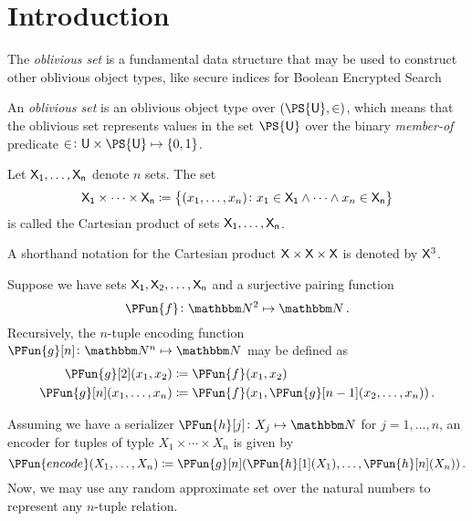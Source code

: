 \documentclass[ ../main.tex]{subfiles}
\begin{document}
\section{Introduction}
The \emph{oblivious set}\cite{oset} is a fundamental data structure that may be used to construct other oblivious object types, like secure indices for Boolean Encrypted Search\cite{sibool}

An \emph{oblivious set} is an oblivious object type over 
$(\PS{\Set{U}},\SetContains)$, which means that the oblivious set represents values in the set $\PS{\Set{U}}$ over the binary \emph{member-of} predicate $\SetContains \colon \Set{U} \times \PS{\Set{U}} \mapsto \{0,1\}$.

\begin{definition}
Let $\Set{X}[1],\ldots,\Set{X}[n]$ denote $n$ sets.
The set
\begin{equation}
\Set{X}[1] \times \cdots \times \Set{X}[n] \coloneqq \left\{(x_1,\ldots,x_n) \colon x_1 \in \Set{X}[1] \land \cdots \land x_n \in \Set{X}[n]\right\}
\end{equation}
is called the Cartesian product of sets $\Set{X}[1],\ldots,\Set{X}[n]$.
\end{definition}
A shorthand notation for the Cartesian product $\Set{X} \times \Set{X} \times \Set{X}$ is denoted by $\Set{X}^3$.

Suppose we have sets $\Set{X}[1],\Set{X}[2],\ldots,\Set{X}[n]$ and a surjective pairing function
\begin{equation}
    \PFun{f} \colon \NatSet^2 \mapsto \NatSet\,.
\end{equation}
Recursively, the $n$-tuple encoding function $\PFun{g}[n] \colon \NatSet^n \mapsto \NatSet$ may be defined as
\begin{align}
	\PFun{g}[2](x_1,x_2)		&\coloneqq \PFun{f}(x_1, x_2)\\
	\PFun{g}[n](x_1,\ldots,x_n) &\coloneqq \PFun{f}(x_1, \PFun{g}[n-1](x_2,\ldots,x_n))\,.
\end{align}

Assuming we have a serializer $\PFun{h}[j] \colon X_j \mapsto \NatSet$ for $j=1,\ldots,n$, an encoder for tuples of typle $X_1 \times \cdots \times X_n$ is given by
\begin{equation}
	\PFun{encode}(X_1,\ldots,X_n) \coloneqq \PFun{g}[n](\PFun{h}[1](X_1),\ldots,\PFun{h}[n](X_n))\,.
\end{equation}
Now, we may use any random approximate set over the natural numbers to represent any $n$-tuple relation.
\end{document}

